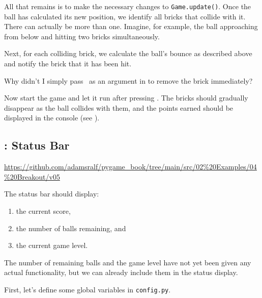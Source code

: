 All that remains is to make the necessary changes to \texttt{Game.update()}. Once the ball has calculated its new position, we identify all bricks that collide with it. There can actually be more than one. Imagine, for example, the ball approaching from below and hitting two bricks simultaneously.

Next, for each colliding brick, we calculate the ball's bounce as described above and notify the brick that it has been hit.

\begin{hintbox}[Why ... ?]
	Why didn't I simply pass \true\ as an argument in  to remove the brick immediately?
\end{hintbox}




Now start the game and let it run after pressing . The bricks should gradually disappear as the ball collides with them, and the points earned should be displayed in the console (see ).

\newpage
\subsection{: Status Bar}

\begin{diskbox}
	\url{https://github.com/adamsralf/pygame_book/tree/main/src/02%20Examples/04%20Breakout/v05}
\end{diskbox}

The status bar should display:
\begin{enumerate}
	\item the current score,
	\item the number of balls remaining, and
	\item the current game level.
\end{enumerate}
\er

The number of remaining balls and the game level have not yet been given any actual functionality, but we can already include them in the status display.

First, let's define some global variables in \texttt{config.py}.

